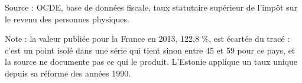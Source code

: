 Source : OCDE, base de données fiscale, taux statutaire supérieur de l'impôt sur le revenu des personnes physiques.\par Note : la valeur publiée pour la France en 2013, 122,8 \%, est écartée du tracé : c'est un point isolé dans une série qui tient sinon entre 45 et 59 pour ce pays, et la source ne documente pas ce qui le produit. L'Estonie applique un taux unique depuis sa réforme des années 1990.
